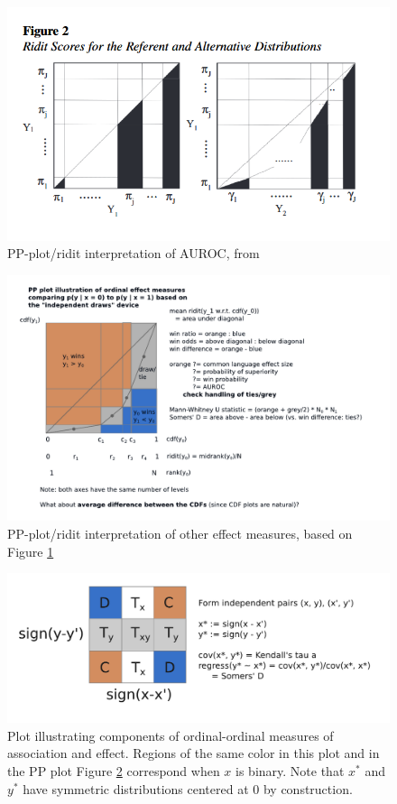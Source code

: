 \documentclass[
  11pt,
  fleqn
]{article}
\begin{document}
\begin{figure}
  \includegraphics[width=5in]{PP_or_ridit_interpretation_of_AUROC.png}
  \caption{PP-plot/ridit interpretation of AUROC, from
  \citet{smithsonReceiverOperatingCharacteristic2023}}
  \label{fig:pp_ridit}
\end{figure}

\begin{figure}
  \includegraphics[width=6.5in]{effect_measures_pp_plot.pdf}
  \caption{PP-plot/ridit interpretation of other effect measures,
  based on Figure \ref{fig:pp_ridit}}
  \label{fig:pp_effect_measures}
\end{figure}

\begin{figure}
  \includegraphics[width=6.5in]{ordinal_xy_pair_signs_plot.pdf}
  \caption{Plot illustrating components of ordinal-ordinal measures
    of association and effect. Regions of the same color in this plot
    and in the PP plot Figure \ref{fig:pp_effect_measures} correspond
    when $x$ is binary. Note that $x^*$ and $y^*$ have symmetric
  distributions centered at 0 by construction.}
  \label{fig:ordinal_xy}
\end{figure}
\end{document}
